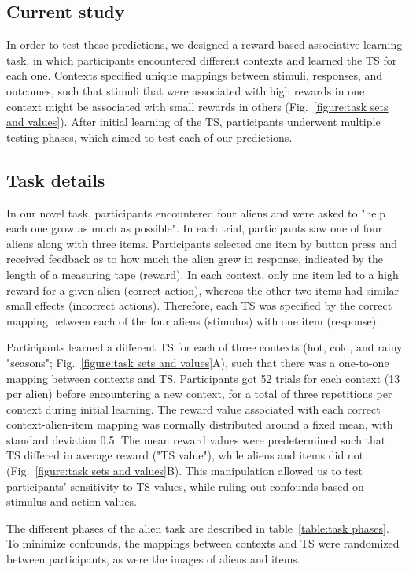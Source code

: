 \documentclass[10pt, letterpaper]{article}
\begin{document}
\subsection{Current study}

In order to test these predictions, we designed a reward-based associative learning task, in which participants encountered different contexts and learned the TS for each one. Contexts specified unique mappings between stimuli, responses, and outcomes, such that stimuli that were associated with high rewards in one context might be associated with small rewards in others (Fig.~\ref{figure:task sets and values}). After initial learning of the TS, participants underwent multiple testing phases, which aimed to test each of our predictions.


\subsection{Task details}

In our novel task, participants encountered four aliens and were asked to "help each one grow as much as possible". In each trial, participants saw one of four aliens along with three items. Participants selected one item by button press and received feedback as to how much the alien grew in response, indicated by the length of a measuring tape (reward). In each context, only one item led to a high reward for a given alien (correct action), whereas the other two items had similar small effects (incorrect actions). Therefore, each TS was specified by the correct mapping between each of the four aliens (stimulus) with one item (response).

Participants learned a different TS for each of three contexts (hot, cold, and rainy "seasons"; Fig.~\ref{figure:task sets and values}A), such that there was a one-to-one mapping between contexts and TS. Participants got 52 trials for each context (13 per alien) before encountering a new context, for a total of three repetitions per context during initial learning. The reward value associated with each correct context-alien-item mapping was normally distributed around a fixed mean, with standard deviation 0.5. The mean reward values were predetermined such that TS differed in average reward ("TS value"), while aliens and items did not (Fig.~\ref{figure:task sets and values}B). This manipulation allowed us to test participants' sensitivity to TS values, while ruling out confounds based on stimulus and action values. 

The different phases of the alien task are described in table~\ref{table:task phases}. To minimize confounds, the mappings between contexts and TS were randomized between participants, as were the images of aliens and items.
\end{document}
